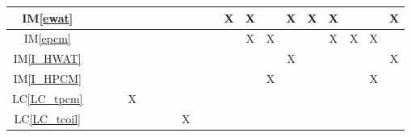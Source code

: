 \documentclass[12pt]{article}
\newcommand{\iref}[1]{IM\ref{#1}}
\newcommand{\lcref}[1]{LC\ref{#1}}
\begin{document}
{\begin{landscape}
\begin{table}[h!]
\begin{tabular}{|c|c|c|c|c|c|c|c|c|c|c|c|c|c|c|c|c|c|c|c|}
                \iref{ewat}         &                            &                 &                &               &                        &                  &                    &                &                 &                   & X               & X                 &                     & X                & X              & X                 &               &                    & X                 \\ \hline
                \iref{epcm}         &                            &                 &                &               &                        &                  &                    &                &                 &                   &                 & X                 & X                   &                  &                & X                 & X             & X                  &                   \\ \hline
                \iref{I_HWAT}       &                            &                 &                &               &                        &                  &                    &                &                 &                   &                 &                   &                     & X                &                &                   &               &                    & X                 \\ \hline
                \iref{I_HPCM}       &                            &                 &                &               &                        &                  &                    &                &                 &                   &                 &                   & X                   &                  &                &                   &               & X                  &                   \\ \hline
                \lcref{LC_tpcm}     &                            &                 &                & X             &                        &                  &                    &                &                 &                   &                 &                   &                     &                  &                &                   &               &                    &                   \\ \hline
                \lcref{LC_tcoil}    &                            &                 &                &               &                        &                  &                    & X              &                 &                   &                 &                   &                     &                  &                &                   &               &                    &                   \\ \hline

\end{tabular}
\end{table}
\end{landscape}}
\end{document}
